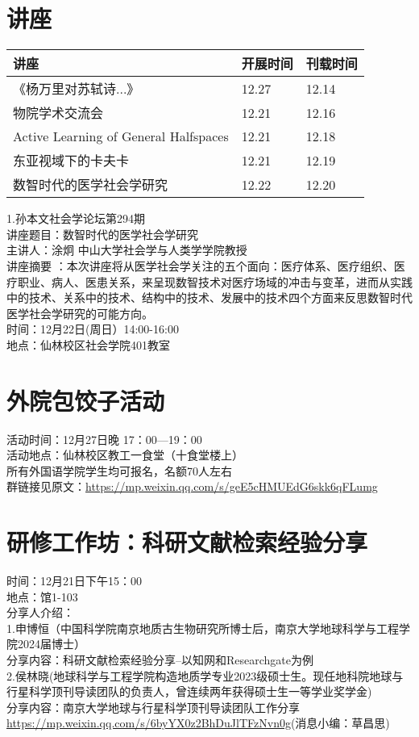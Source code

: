 \documentclass[letterpaper, 12pt]{article}
\begin{document}
\begin{multicols}{2}

\section{讲座}
\begin{tabularx}{0.5\textwidth}{|X|X|X|}
    \hline
    讲座 & 开展时间 & 刊载时间\\
    \hline\hline
《杨万里对苏轼诗...》 & 12.27 & 12.14\\\hline
物院学术交流会 & 12.21 & 12.16\\\hline
Active Learning of General Halfspaces & 12.21 & 12.18\\\hline
东亚视域下的卡夫卡 & 12.21 & 12.19\\\hline
数智时代的医学社会学研究 & 12.22 & 12.20\\\hline
\end{tabularx}

1.孙本文社会学论坛第294期\\
讲座题目：数智时代的医学社会学研究\\
主讲人：涂炯 中山大学社会学与人类学学院教授\\
讲座摘要 ：本次讲座将从医学社会学关注的五个面向：医疗体系、医疗组织、医疗职业、病人、医患关系，来呈现数智技术对医疗场域的冲击与变革，进而从实践中的技术、关系中的技术、结构中的技术、发展中的技术四个方面来反思数智时代医学社会学研究的可能方向。\\
时间：12月22日(周日）14:00-16:00\\
地点：仙林校区社会学院401教室\\

\section{外院包饺子活动}
活动时间：12月27日晚 17：00—19：00\\
活动地点：仙林校区教工一食堂（十食堂楼上）\\
所有外国语学院学生均可报名，名额70人左右\\
群链接见原文：\url{https://mp.weixin.qq.com/s/geE5cHMUEdG6skk6qFLumg}

\section{研修工作坊：科研文献检索经验分享}
时间：12月21日下午15：00\\
地点：馆1-103\\
分享人介绍：\\
1.申博恒（中国科学院南京地质古生物研究所博士后，南京大学地球科学与工程学院2024届博士）\\
分享内容：科研文献检索经验分享--以知网和Researchgate为例\\
2.侯林晓(地球科学与工程学院构造地质学专业2023级硕士生。现任地科院地球与行星科学顶刊导读团队的负责人，曾连续两年获得硕士生一等学业奖学金)\\
分享内容：南京大学地球与行星科学顶刊导读团队工作分享\\
\url{https://mp.weixin.qq.com/s/6byYX0z2BhDuJlTFzNvn0g}(消息小编：草昌思)


\end{multicols}
\end{document}
